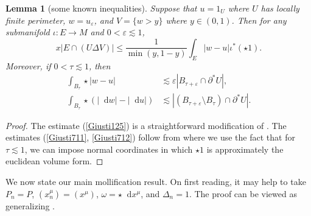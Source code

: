 \documentclass[reqno,10pt]{amsart}
\newcommand*\dif{\mathop{}\!\mathrm{d}}
\newtheorem{lemma}[theorem]{Lemma}
\theoremstyle{definition}
\numberwithin{equation}{section}
\begin{document}
\begin{lemma}[some known inequalities]
Suppose that $u = 1_U$ where $U$ has locally finite perimeter, $w = u_\varepsilon$, and $V = \{w > y\}$ where $y \in (0, 1)$.
Then for any submanifold $\iota: E \to M$ and $0 < \varepsilon \lesssim 1$,
\begin{equation}\label{Giusti125}
x|E \cap (U \Delta V)| \leq \frac{1}{\min(y, 1 - y)} \int_E |w - u| \iota^*(\star 1).
\end{equation}
Moreover, if $0 < \tau \lesssim 1$, then
\begin{align}
\int_{B_\tau} \star |w - u| &\lesssim \varepsilon |B_{\tau + \varepsilon} \cap \partial^* U|, \label{Giusti711}\\
\int_{B_\tau} \star (|\dif w| - |\dif u|) &\lesssim |(B_{\tau + \varepsilon} \setminus B_\tau) \cap \partial^* U|. \label{Giusti712}
\end{align}
\end{lemma}
\begin{proof}
The estimate (\ref{Giusti125}) is a straightforward modification of \cite[Lemma 1.25]{Giusti77}.
The estimates (\ref{Giusti711}, \ref{Giusti712}) follow from \cite[Lemma 7.2]{Giusti77} where we use the fact that for $\tau \lesssim 1$, we can impose normal coordinates in which $\star 1$ is approximately the euclidean volume form.
\end{proof}

We now state our main mollification result.
On first reading, it may help to take $P_n = P$, $(x^\mu_n) = (x^\mu)$, $\omega = \star \dif x^\mu$, and $\Delta_n = 1$.
The proof can be viewed as generalizing \cite[Lemma 7.5]{Giusti77}.
\end{document}

